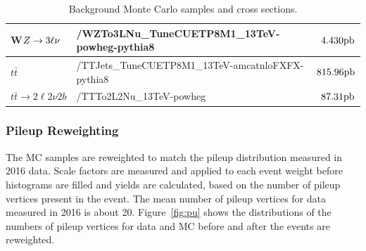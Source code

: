 \begin{table}
\begin{footnotesize}
{\begin{tabular}{l|l|r}
 W$Z \to 3\ell\nu$ & /WZTo3LNu\_TuneCUETP8M1\_13TeV-powheg-pythia8 & $4.430 \rm{ pb}$ \\ \hline
 $t\bar{t}$ & /TTJets\_TuneCUETP8M1\_13TeV-amcatnloFXFX-pythia8 & $815.96 \rm{ pb}$ \\ 
 $t\bar{t} \to 2\ell2\nu 2b$ & /TTTo2L2Nu\_13TeV-powheg &  $87.31 \rm{pb}$ \\ \hline
 \end{tabular}}
 \caption{Background Monte Carlo samples and cross sections.}
  \label{tab:MCsamples}
\end{footnotesize}
\end{table}

\subsubsection{Pileup Reweighting}

The MC samples are reweighted to match the pileup distribution measured in 2016 data. Scale factors are measured and applied to each event weight before histograms are filled and yields are calculated, based on the number of pileup vertices present in the event. The mean number of pileup vertices for data measured in 2016 is about 20. Figure~\ref{fig:pu} shows the distributions of the numbers of pileup vertices for data and MC before and after the events are reweighted.

